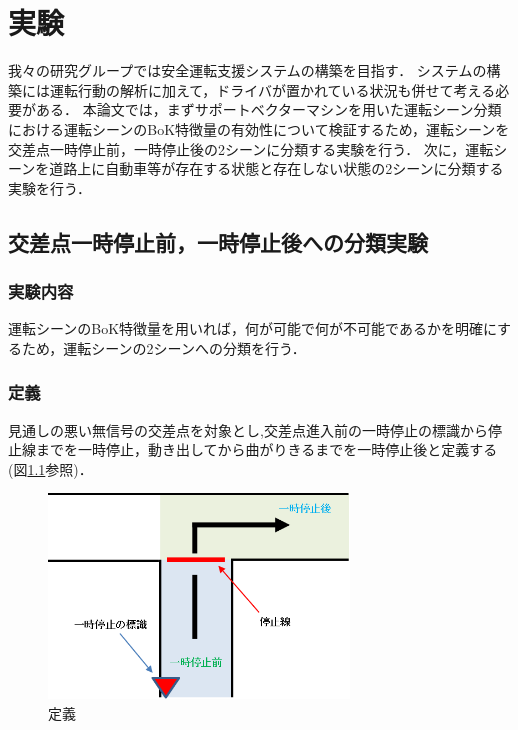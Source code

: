 \chapter{実験}\label{zikken.tex}
我々の研究グループでは安全運転支援システムの構築を目指す．
システムの構築には運転行動の解析に加えて，ドライバが置かれている状況も併せて考える必要がある．
本論文では，まずサポートベクターマシンを用いた運転シーン分類における運転シーンのBoK特徴量の有効性について検証するため，運転シーンを交差点一時停止前，一時停止後の2シーンに分類する実験を行う．
次に，運転シーンを道路上に自動車等が存在する状態と存在しない状態の2シーンに分類する実験を行う．

\section{交差点一時停止前，一時停止後への分類実験}

\subsection{実験内容}
運転シーンのBoK特徴量を用いれば，何が可能で何が不可能であるかを明確にするため，運転シーンの2シーンへの分類を行う．\\

\subsection{定義}
見通しの悪い無信号の交差点を対象とし,交差点進入前の一時停止の標識から停止線までを一時停止，動き出してから曲がりきるまでを一時停止後と定義する(図\ref{fig:teigi}参照)．

\begin{figure}[htbp]
  \begin{center}
    \includegraphics[clip,width=8.0cm]{./images/teigi.png}
    \caption{定義}
    \label{fig:teigi}
  \end{center}
\end{figure}

